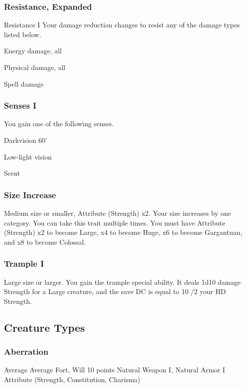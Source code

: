 \subsubsection{Resistance, Expanded}
\featpre Resistance I
\featben Your damage reduction changes to resist any of the damage types listed below.
\begin{itemize*}
    \item Energy damage, all
    \item Physical damage, all
    \item Spell damage
\end{itemize*}

\subsubsection{Senses I}
\featben You gain one of the following senses.
\begin{itemize*}
    \item Darkvision 60'
    \item Low-light vision
    \item Scent
\end{itemize*}

\subsubsection{Size Increase}
\featpre Medium size or smaller, Attribute (Strength) x2.
\featben Your size increases by one category.
 You can take this trait multiple times. You must have Attribute (Strength) x2 to become Large, x4 to become Huge, x6 to become Gargantuan, and x8 to become Colossal.

\subsubsection{Trample I}
\featpre Large size or larger.
\featben You gain the trample special ability. It deals 1d10 damage \add Strength for a Large creature, and the save DC is equal to 10 /2 your HD \add Strength.

\subsection{Creature Types}

\subsubsection{Aberration}
\tbab Average
\tsaves Average Fort, Will
 10 points
 Natural Weapon I, Natural Armor I
 Attribute (Strength, Constitution, Charisma)

